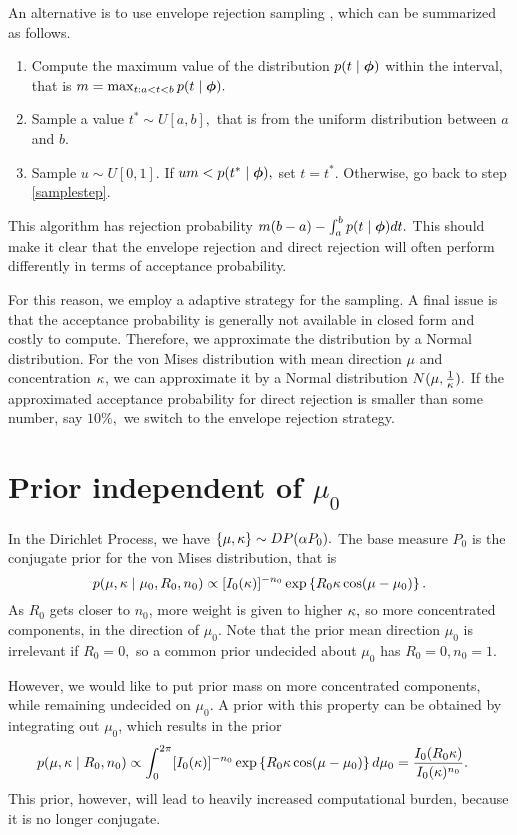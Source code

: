 An alternative is to use envelope rejection sampling \citep{gilks1992adaptive}, which can be summarized as follows.
\begin{enumerate}
\item Compute the maximum value of the distribution $p(t \mid \boldsymbol{\phi})$ within the interval, that is $m = \max_{t : a < t < b} p(t \mid \boldsymbol{\phi}).$
\item Sample a value $t^\ast \sim U[a, b],$ that is from the uniform distribution between $a$ and $b$.\label{samplestep}
\item Sample $u \sim U[0, 1].$ If $um < p(t^\ast \mid \boldsymbol{\phi}),$ set $t = t^\ast.$ Otherwise, go back to step \ref{samplestep}.
\end{enumerate}
This algorithm has rejection probability $m(b - a) - \int_{a}^{b} p(t \mid \boldsymbol{\phi}) dt.$ This should make it clear that the envelope rejection and  direct rejection will often perform differently in terms of acceptance probability.

For this reason, we employ a adaptive strategy for the sampling. A final issue is that the acceptance probability is generally not available in closed form and costly to compute. Therefore, we approximate the distribution by a Normal distribution. For the von Mises distribution with mean direction $\mu$ and concentration $\kappa$, we can approximate it by a Normal distribution $N(\mu, \frac{1}{\kappa}).$ If the approximated acceptance probability for direct rejection is smaller than some number, say $10\%,$ we switch to the envelope rejection strategy.

\newpage

\section{Prior independent of $\mu_0$} \label{margprior}

In the Dirichlet Process, we have $\{\mu, \kappa\} \sim DP(\alpha P_0).$ The base measure $P_0$ is the conjugate prior for the von Mises distribution, that is
\begin{equation}
p(\mu, \kappa \mid \mu_0, R_0, n_0) \propto [I_0(\kappa)]^{-n_0} \exp\left\{ R_0 \kappa \cos(\mu - \mu_0)\right\}.
\end{equation}
As $R_0$ gets closer to $n_0$, more weight is given to higher $\kappa,$ so more concentrated components, in the direction of $\mu_0$. Note that the prior mean direction $\mu_0$ is irrelevant if $R_0 = 0,$ so a common prior undecided about $\mu_0$ has $R_0 = 0, n_0 = 1.$

However, we would like to put prior mass on more concentrated components, while remaining undecided on $\mu_0$. A prior with this property can be obtained by integrating out $\mu_0$, which results in the prior
\begin{align}
p(\mu, \kappa \mid R_0, n_0)  &\propto \int_0^{2\pi} [I_0(\kappa)]^{-n_0} \exp\left\{ R_0 \kappa \cos(\mu - \mu_0)\right\} d\mu_0
= \frac{I_0(R_0 \kappa)}{I_0(\kappa)^{n_0}}.
\end{align}
This prior, however, will lead to heavily increased computational burden, because it  is no longer conjugate.


